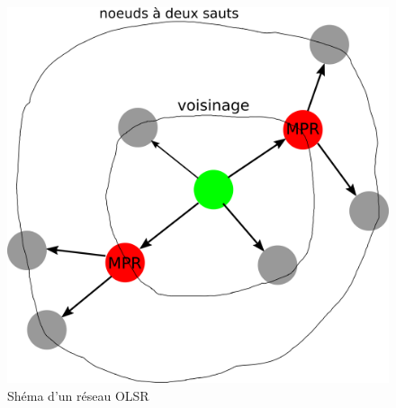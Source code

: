 \documentclass[a4paper, 12pt]{report}
\begin{document}
        \begin{figure}[H]
            \centering
            \includegraphics[scale=0.5]{images/olsr.png}
            \caption{Shéma d'un réseau OLSR}
            \label{olsr}
        \end{figure}
\end{document}
